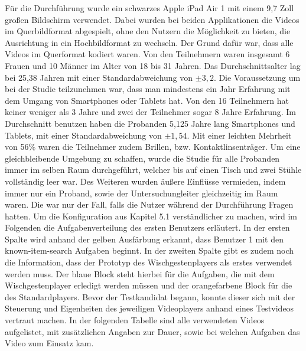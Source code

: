 \documentclass[11pt,a4paper]{report}
\begin{document}
Für die Durchführung wurde ein schwarzes Apple iPad Air 1 mit einem 9,7 Zoll großen Bildschirm verwendet. Dabei wurden bei beiden Applikationen die Videos im Querbildformat abgespielt, ohne den Nutzern die Möglichkeit zu bieten, die Ausrichtung in ein Hochbildformat zu wechseln. Der Grund dafür war, dass alle Videos im Querformat kodiert waren. Von den Teilnehmern waren insgesamt 6 Frauen und 10 Männer im Alter von 18 bis 31 Jahren. Das Durchschnittsalter lag bei 25,38 Jahren mit einer Standardabweichung von $\pm 3,2$. Die Voraussetzung um bei der Studie teilzunehmen war, dass man mindestens ein Jahr Erfahrung mit dem Umgang von Smartphones oder Tablets hat. Von den 16 Teilnehmern hat keiner weniger als 3 Jahre und zwei der Teilnehmer sogar 8 Jahre Erfahrung. Im Durchschnitt benutzen haben die Probanden 5,125 Jahre lang Smartphones und Tablets, mit einer Standardabweichung von $\pm 1,54$. Mit einer leichten Mehrheit von 56\% waren die Teilnehmer zudem Brillen, bzw. Kontaktlinsenträger. Um eine gleichbleibende Umgebung zu schaffen, wurde die Studie für alle Probanden immer im selben Raum durchgeführt, welcher bis auf einen Tisch und zwei Stühle vollständig leer war. Des Weiteren wurden äußere Einflüsse vermieden, indem immer nur ein Proband, sowie der Untersuchungleiter gleichzeitig im Raum waren. Die war nur der Fall, falls die Nutzer während der Durchführung Fragen hatten. Um die Konfiguration aus Kapitel 5.1 verständlicher zu machen, wird im Folgenden die Aufgabenverteilung des ersten Benutzers erläutert. In der ersten Spalte wird anhand der gelben Ausfärbung erkannt, dass Benutzer 1 mit den known-item-search Aufgaben beginnt. In der zweiten Spalte gibt es zudem noch die Information, dass der Prototyp des Wischgestenplayers als erstes verwendet werden muss. Der blaue Block steht hierbei für die Aufgaben, die mit dem Wischgestenplayer erledigt werden müssen und der orangefarbene Block für die des Standardplayers. Bevor der Testkandidat begann, konnte dieser sich mit der Steuerung und Eigenheiten des jeweiligen Videoplayers anhand eines Testvideos vertraut machen. In der folgenden Tabelle sind alle verwendeten Videos aufgelistet, mit zusätzlichen Angaben zur Dauer, sowie bei welchen Aufgaben das Video zum Einsatz kam.
\end{document}
